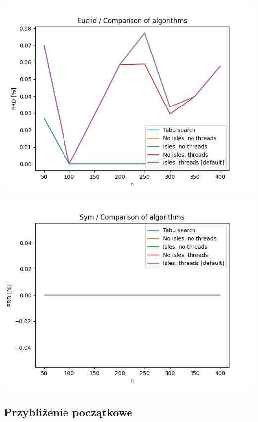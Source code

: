 \documentclass{article}
\begin{document}
\begin{center}
\includegraphics[width=\textwidth, 
                   height = 0.4\textheight, 
                   keepaspectratio]
                  {plots/euclid_1_comparison} 
\end{center}

\begin{center}
\includegraphics[width=\textwidth, 
                   height = 0.4\textheight, 
                   keepaspectratio]
                  {plots/sym_1_comparison} 
\end{center}


\subsection{Przybliżenie początkowe}
\end{document}
